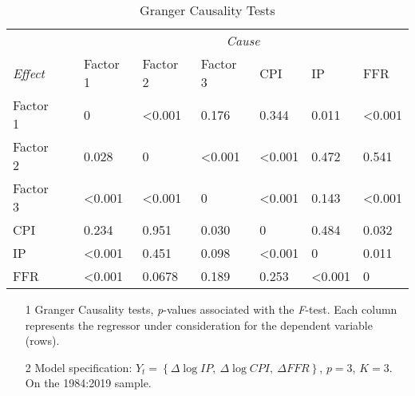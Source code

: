 \begin{table}[H]
\centering
\caption{Granger Causality Tests}
\label{tab:GCTest}
\begin{adjustbox}{max width=\textwidth}
\begin{tabular}{llllllll}
\toprule 
 & & \multicolumn{6}{c}{\textit{Cause}}\\ \cmidrule(l){3-8}  
\textit{Effect} & & Factor 1 & Factor 2 & Factor 3 & CPI & IP & FFR \\ 
\midrule 
Factor 1 && 0      & <0.001 & 0.176  & 0.344 & 0.011 & <0.001 \\ 
Factor 2 && 0.028  & 0      & <0.001 & <0.001 & 0.472  & 0.541 \\ 
Factor 3 && <0.001 & <0.001 & 0      & <0.001 & 0.143 & <0.001 \\
CPI       && 0.234 & 0.951  & 0.030  & 0     & 0.484  & 0.032 \\ 
IP      && <0.001 & 0.451  & 0.098  & <0.001 & 0      & 0.011 \\ 
FFR      && <0.001  & 0.0678  & 0.189  & 0.253 & <0.001  & 0 \\ 
\bottomrule 
\end{tabular}
\end{adjustbox}
\begin{minipage}{0.88\textwidth}
    {\footnotesize
    \begin{enumerate}
        \item[] 
        \item[1] Granger Causality tests, \textit{p}-values associated with the \textit{F}-test. Each column represents the regressor under consideration for the dependent variable (rows).
        \item[2] Model specification: $Y_t = \left\{\Delta \log IP,\ \Delta \log CPI,\ \Delta FFR\right\}$, $p=3$, $K=3$. On the 1984:2019 sample.
    \end{enumerate}
    }\end{minipage}
\end{table}